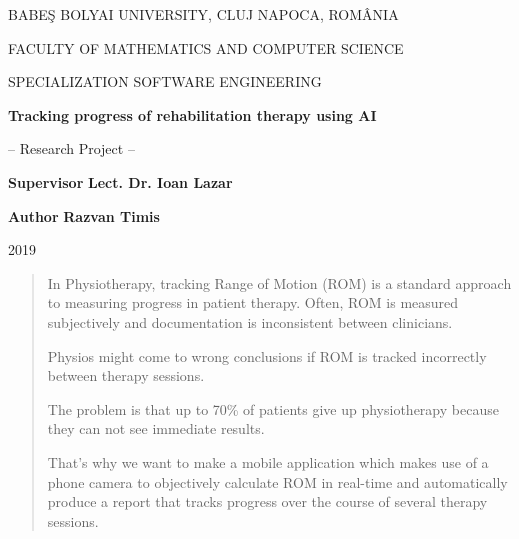 \documentclass[runningheads,a4paper,11pt]{report}
\begin{document}
\begin{titlepage}
\sloppy
\begin{center}
BABE\c S BOLYAI UNIVERSITY, CLUJ NAPOCA, ROM\^ ANIA

FACULTY OF MATHEMATICS AND COMPUTER SCIENCE

SPECIALIZATION SOFTWARE ENGINEERING 

\vspace{5cm}

\Huge \textbf{Tracking progress of rehabilitation therapy using AI}

\vspace{1cm}

\normalsize -- Research Project --

\end{center}


\vspace{5cm}

\begin{flushleft}
\textbf{Supervisor} \break
\Large{\textbf{Lect. Dr. Ioan Lazar}}
\end{flushleft}

\begin{flushright}
\textbf{Author} \break
\Large{\textbf{Razvan Timis}}
\end{flushright}

\vspace{4cm}

\begin{center}
2019
\end{center}

\end{titlepage}


\renewcommand{\contentsname}{Table of Contents}
\tableofcontents



\newpage


\begin{abstract}
\par In Physiotherapy, tracking Range of Motion (ROM) is a standard approach to measuring progress in patient therapy. Often, ROM is measured subjectively and documentation is inconsistent between clinicians.
\par Physios might come to wrong conclusions if ROM is tracked incorrectly between therapy sessions.
\par The problem is that up to 70\% of patients give up physiotherapy because they can not see immediate results.
\par That\mbox{'}s why we want to make a mobile application which makes use of a phone camera to objectively calculate ROM in real-time and automatically produce a report that tracks progress over the course of several therapy sessions.


\end{abstract}
\end{document}
